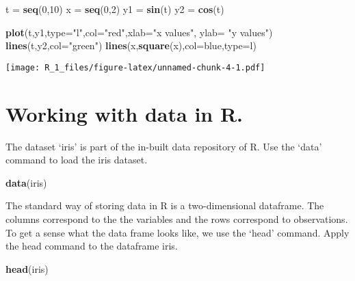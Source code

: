 \documentclass[
]{article}
\newenvironment{Shaded}{\begin{snugshade}}{\end{snugshade}}
\newcommand{\AttributeTok}[1]{\textcolor[rgb]{0.13,0.29,0.53}{#1}}
\newcommand{\DecValTok}[1]{\textcolor[rgb]{0.00,0.00,0.81}{#1}}
\newcommand{\FunctionTok}[1]{\textcolor[rgb]{0.13,0.29,0.53}{\textbf{#1}}}
\newcommand{\NormalTok}[1]{#1}
\newcommand{\OtherTok}[1]{\textcolor[rgb]{0.56,0.35,0.01}{#1}}
\newcommand{\StringTok}[1]{\textcolor[rgb]{0.31,0.60,0.02}{#1}}
\begin{document}
\begin{Shaded}
\begin{Highlighting}[]
\NormalTok{t }\OtherTok{=} \FunctionTok{seq}\NormalTok{(}\DecValTok{0}\NormalTok{,}\DecValTok{10}\NormalTok{)}
\NormalTok{x }\OtherTok{=} \FunctionTok{seq}\NormalTok{(}\DecValTok{0}\NormalTok{,}\DecValTok{2}\NormalTok{)}
\NormalTok{y1 }\OtherTok{=} \FunctionTok{sin}\NormalTok{(t)}
\NormalTok{y2 }\OtherTok{=} \FunctionTok{cos}\NormalTok{(t)}


\FunctionTok{plot}\NormalTok{(t,y1,}\AttributeTok{type=}\StringTok{"l"}\NormalTok{,}\AttributeTok{col=}\StringTok{"red"}\NormalTok{,}\AttributeTok{xlab=}\StringTok{"x values"}\NormalTok{, }\AttributeTok{ylab=} \StringTok{"y values"}\NormalTok{)}
\FunctionTok{lines}\NormalTok{(t,y2,}\AttributeTok{col=}\StringTok{"green"}\NormalTok{)}
\FunctionTok{lines}\NormalTok{(x,}\FunctionTok{square}\NormalTok{(x),}\AttributeTok{col=}\StringTok{\textquotesingle{}blue\textquotesingle{}}\NormalTok{,}\AttributeTok{type=}\StringTok{\textquotesingle{}l\textquotesingle{}}\NormalTok{)}
\end{Highlighting}
\end{Shaded}

\texttt{[image: R\_1\_files/figure-latex/unnamed-chunk-4-1.pdf]}

\hypertarget{working-with-data-in-r.}{%
\section{Working with data in R.}\label{working-with-data-in-r.}}

The dataset `iris' is part of the in-built data repository of R. Use the
`data' command to load the iris dataset.

\begin{Shaded}
\begin{Highlighting}[]
\FunctionTok{data}\NormalTok{(iris)}
\end{Highlighting}
\end{Shaded}

The standard way of storing data in R is a two-dimensional dataframe.
The columns correspond to the the variables and the rows correspond to
observations. To get a sense what the data frame looks like, we use the
`head' command. Apply the head command to the dataframe iris.

\begin{Shaded}
\begin{Highlighting}[]
\FunctionTok{head}\NormalTok{(iris)}
\end{Highlighting}
\end{Shaded}
\end{document}
